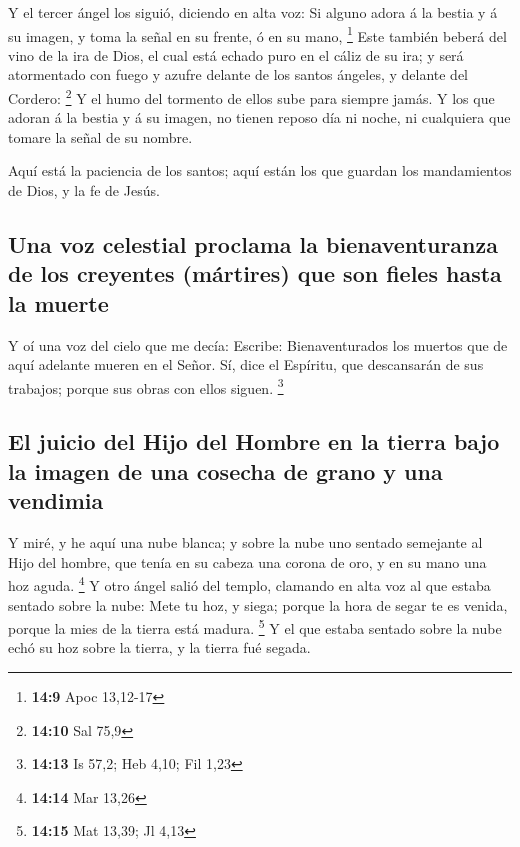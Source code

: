  Y el tercer ángel los siguió, diciendo en alta voz: Si
alguno adora á la bestia y á su imagen, y toma la señal en su frente, ó
en su mano, \footnote{\textbf{14:9} Apoc 13,12-17}  Este
también beberá del vino de la ira de Dios, el cual está echado puro en
el cáliz de su ira; y será atormentado con fuego y azufre delante de los
santos ángeles, y delante del Cordero: \footnote{\textbf{14:10} Sal 75,9}
 Y el humo del tormento de ellos sube para siempre jamás.
Y los que adoran á la bestia y á su imagen, no tienen reposo día ni
noche, ni cualquiera que tomare la señal de su nombre.

 Aquí está la paciencia de los santos; aquí están los que
guardan los mandamientos de Dios, y la fe de Jesús.

\hypertarget{una-voz-celestial-proclama-la-bienaventuranza-de-los-creyentes-muxe1rtires-que-son-fieles-hasta-la-muerte}{%
\subsection{Una voz celestial proclama la bienaventuranza de los
creyentes (mártires) que son fieles hasta la
muerte}\label{una-voz-celestial-proclama-la-bienaventuranza-de-los-creyentes-muxe1rtires-que-son-fieles-hasta-la-muerte}}

 Y oí una voz del cielo que me decía: Escribe:
Bienaventurados los muertos que de aquí adelante mueren en el Señor. Sí,
dice el Espíritu, que descansarán de sus trabajos; porque sus obras con
ellos siguen. \footnote{\textbf{14:13} Is 57,2; Heb 4,10; Fil 1,23}

\hypertarget{el-juicio-del-hijo-del-hombre-en-la-tierra-bajo-la-imagen-de-una-cosecha-de-grano-y-una-vendimia}{%
\subsection{El juicio del Hijo del Hombre en la tierra bajo la imagen de
una cosecha de grano y una
vendimia}\label{el-juicio-del-hijo-del-hombre-en-la-tierra-bajo-la-imagen-de-una-cosecha-de-grano-y-una-vendimia}}

 Y miré, y he aquí una nube blanca; y sobre la nube uno
sentado semejante al Hijo del hombre, que tenía en su cabeza una corona
de oro, y en su mano una hoz aguda. \footnote{\textbf{14:14} Mar 13,26}
 Y otro ángel salió del templo, clamando en alta voz al
que estaba sentado sobre la nube: Mete tu hoz, y siega; porque la hora
de segar te es venida, porque la mies de la tierra está madura.
\footnote{\textbf{14:15} Mat 13,39; Jl 4,13}  Y el que
estaba sentado sobre la nube echó su hoz sobre la tierra, y la tierra
fué segada.

